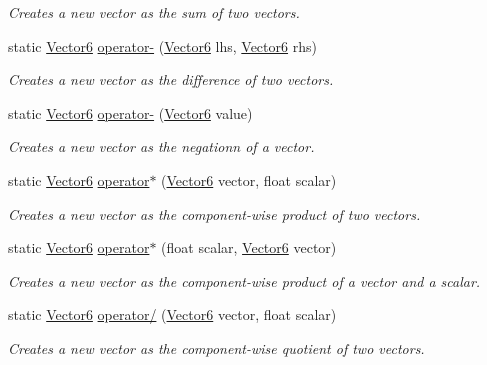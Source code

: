 \begin{DoxyCompactItemize}
\begin{DoxyCompactList}\small\item\em Creates a new vector as the sum of two vectors.\end{DoxyCompactList}\item 
static \hyperlink{class_grid_framework_1_1_vectors_1_1_vector6}{Vector6} \hyperlink{class_grid_framework_1_1_vectors_1_1_vector6_adea3b70326107a08d8e27f5ebe287efe_adea3b70326107a08d8e27f5ebe287efe}{operator-\/} (\hyperlink{class_grid_framework_1_1_vectors_1_1_vector6}{Vector6} lhs, \hyperlink{class_grid_framework_1_1_vectors_1_1_vector6}{Vector6} rhs)
\begin{DoxyCompactList}\small\item\em Creates a new vector as the difference of two vectors.\end{DoxyCompactList}\item 
static \hyperlink{class_grid_framework_1_1_vectors_1_1_vector6}{Vector6} \hyperlink{class_grid_framework_1_1_vectors_1_1_vector6_a2ff7010c55e18371374e038d2abdbdd0_a2ff7010c55e18371374e038d2abdbdd0}{operator-\/} (\hyperlink{class_grid_framework_1_1_vectors_1_1_vector6}{Vector6} value)
\begin{DoxyCompactList}\small\item\em Creates a new vector as the negationn of a vector.\end{DoxyCompactList}\item 
static \hyperlink{class_grid_framework_1_1_vectors_1_1_vector6}{Vector6} \hyperlink{class_grid_framework_1_1_vectors_1_1_vector6_ab205d2fcc39d2a59b26bed3af1a45a19_ab205d2fcc39d2a59b26bed3af1a45a19}{operator$\ast$} (\hyperlink{class_grid_framework_1_1_vectors_1_1_vector6}{Vector6} vector, float scalar)
\begin{DoxyCompactList}\small\item\em Creates a new vector as the component-\/wise product of two vectors.\end{DoxyCompactList}\item 
static \hyperlink{class_grid_framework_1_1_vectors_1_1_vector6}{Vector6} \hyperlink{class_grid_framework_1_1_vectors_1_1_vector6_a29fa5384c0099e3c7a430b6cc556f5b8_a29fa5384c0099e3c7a430b6cc556f5b8}{operator$\ast$} (float scalar, \hyperlink{class_grid_framework_1_1_vectors_1_1_vector6}{Vector6} vector)
\begin{DoxyCompactList}\small\item\em Creates a new vector as the component-\/wise product of a vector and a scalar.\end{DoxyCompactList}\item 
static \hyperlink{class_grid_framework_1_1_vectors_1_1_vector6}{Vector6} \hyperlink{class_grid_framework_1_1_vectors_1_1_vector6_a5d6c4a94bc5af2b7f998898fa43ee6e4_a5d6c4a94bc5af2b7f998898fa43ee6e4}{operator/} (\hyperlink{class_grid_framework_1_1_vectors_1_1_vector6}{Vector6} vector, float scalar)
\begin{DoxyCompactList}\small\item\em Creates a new vector as the component-\/wise quotient of two vectors.\end{DoxyCompactList}\end{DoxyCompactItemize}
